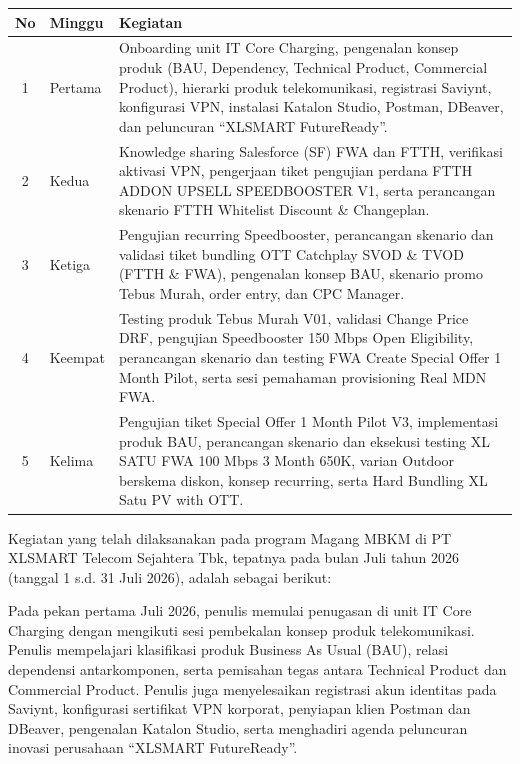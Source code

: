 \documentclass[12pt,a4paper]{article}
\begin{document}
\vspace{0.2cm}
\begin{singlespace}
\noindent
\begin{tabular}{|c|p{2.0cm}|p{11.5cm}|}
\hline
\textbf{No} & \textbf{Minggu} & \textbf{Kegiatan} \\
\hline
1 & Pertama & Onboarding unit IT Core Charging, pengenalan konsep produk (BAU, Dependency, Technical Product, Commercial Product), hierarki produk telekomunikasi, registrasi Saviynt, konfigurasi VPN, instalasi Katalon Studio, Postman, DBeaver, dan peluncuran ``XLSMART FutureReady''. \\
\hline
2 & Kedua & Knowledge sharing Salesforce (SF) FWA dan FTTH, verifikasi aktivasi VPN, pengerjaan tiket pengujian perdana FTTH ADDON UPSELL SPEEDBOOSTER V1, serta perancangan skenario FTTH Whitelist Discount \& Changeplan. \\
\hline
3 & Ketiga & Pengujian recurring Speedbooster, perancangan skenario dan validasi tiket bundling OTT Catchplay SVOD \& TVOD (FTTH \& FWA), pengenalan konsep BAU, skenario promo Tebus Murah, order entry, dan CPC Manager. \\
\hline
4 & Keempat & Testing produk Tebus Murah V01, validasi Change Price DRF, pengujian Speedbooster 150 Mbps Open Eligibility, perancangan skenario dan testing FWA Create Special Offer 1 Month Pilot, serta sesi pemahaman provisioning Real MDN FWA. \\
\hline
5 & Kelima & Pengujian tiket Special Offer 1 Month Pilot V3, implementasi produk BAU, perancangan skenario dan eksekusi testing XL SATU FWA 100 Mbps 3 Month 650K, varian Outdoor berskema diskon, konsep recurring, serta Hard Bundling XL Satu PV with OTT. \\
\hline
\end{tabular}
\end{singlespace}

\vspace{0.3cm}
\noindent Kegiatan yang telah dilaksanakan pada program Magang MBKM di PT XLSMART Telecom Sejahtera Tbk, tepatnya pada bulan Juli tahun 2026 (tanggal 1 s.d. 31 Juli 2026), adalah sebagai berikut:

Pada pekan pertama Juli 2026, penulis memulai penugasan di unit IT Core Charging dengan mengikuti sesi pembekalan konsep produk telekomunikasi. Penulis mempelajari klasifikasi produk Business As Usual (BAU), relasi dependensi antarkomponen, serta pemisahan tegas antara Technical Product dan Commercial Product. Penulis juga menyelesaikan registrasi akun identitas pada Saviynt, konfigurasi sertifikat VPN korporat, penyiapan klien Postman dan DBeaver, pengenalan Katalon Studio, serta menghadiri agenda peluncuran inovasi perusahaan ``XLSMART FutureReady''.
\end{document}

